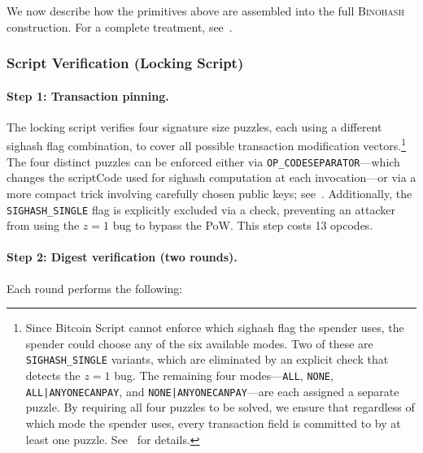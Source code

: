 \documentclass[11pt, a4paper]{article}
\begin{document}
We now describe how the primitives above are assembled into the full \textsc{Binohash} construction. For a complete treatment, see~\cite{linus2024binohash}.

\subsubsection{Script Verification (Locking Script)}

\paragraph{Step 1: Transaction pinning.}
The locking script verifies four signature size puzzles, each using a different sighash flag combination, to cover all possible transaction modification vectors.\footnote{Since Bitcoin Script cannot enforce which sighash flag the spender uses, the spender could choose any of the six available modes. Two of these are \texttt{SIGHASH\_SINGLE} variants, which are eliminated by an explicit check that detects the $z = 1$ bug. The remaining four modes---\texttt{ALL}, \texttt{NONE}, \texttt{ALL|ANYONECANPAY}, and \texttt{NONE|ANYONECANPAY}---are each assigned a separate puzzle. By requiring all four puzzles to be solved, we ensure that regardless of which mode the spender uses, every transaction field is committed to by at least one puzzle. See~\cite[Section~5]{linus2024binohash} for details.} The four distinct puzzles can be enforced either via \texttt{OP\_CODESEPARATOR}---which changes the scriptCode used for sighash computation at each invocation---or via a more compact trick involving carefully chosen public keys; see~\cite[Appendix~A]{linus2024binohash}. Additionally, the \texttt{SIGHASH\_SINGLE} flag is explicitly excluded via a check, preventing an attacker from using the $z = 1$ bug to bypass the PoW. This step costs 13 opcodes.

\paragraph{Step 2: Digest verification (two rounds).}
Each round performs the following:
\end{document}

